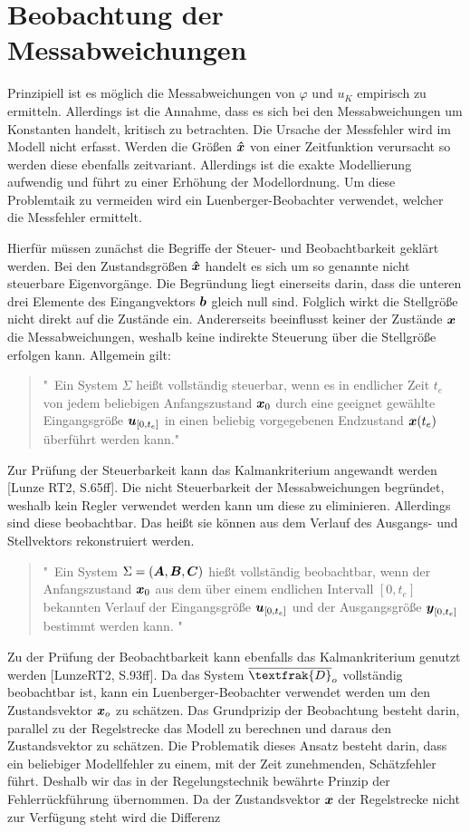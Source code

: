 \section{Beobachtung der Messabweichungen}
Prinzipiell ist es möglich die Messabweichungen von $\varphi$ und $u_K$ empirisch zu ermitteln. Allerdings ist die Annahme, dass es sich bei den Messabweichungen um Konstanten handelt, kritisch zu betrachten. Die Ursache der Messfehler wird im Modell nicht erfasst. Werden die Größen $\boldsymbol{\hat{x}}$ von einer Zeitfunktion verursacht so werden diese ebenfalls zeitvariant. Allerdings ist die exakte Modellierung aufwendig und führt zu einer Erhöhung der Modellordnung. Um diese Problemtaik zu vermeiden wird ein Luenberger-Beobachter verwendet, welcher die Messfehler ermittelt.

Hierfür müssen zunächst die Begriffe der Steuer- und Beobachtbarkeit geklärt werden. Bei den Zustandsgrößen $\boldsymbol{\hat{x}}$ handelt es sich um so genannte nicht steuerbare Eigenvorgänge. Die Begründung liegt einerseits darin, dass die unteren drei Elemente des Eingangvektors $\boldsymbol{b}$ gleich null sind. Folglich wirkt die Stellgröße nicht direkt auf die Zustände ein. Andererseits beeinflusst keiner der Zustände $\boldsymbol{x}$ die Messabweichungen, weshalb keine indirekte Steuerung über die Stellgröße erfolgen kann. Allgemein gilt:
\begin{quote}
"\ Ein System $\Sigma$ heißt vollständig steuerbar, wenn es in endlicher Zeit $t_e$ von jedem beliebigen Anfangszustand $\boldsymbol{x}_0$ durch eine geeignet gewählte Eingangsgröße $\boldsymbol{u}_{[0,t_e]}$ in einen beliebig vorgegebenen Endzustand $\boldsymbol{x}(t_e)$ überführt werden kann."
\end{quote}
Zur Prüfung der Steuerbarkeit kann das Kalmankriterium angewandt werden [Lunze RT2, S.65ff]. Die nicht Steuerbarkeit der Messabweichungen begründet, weshalb kein Regler verwendet werden kann um diese zu eliminieren. Allerdings sind diese beobachtbar. Das heißt sie können aus dem Verlauf des Ausgangs- und Stellvektors rekonstruiert werden.
\begin{quote}
"\ Ein System $\Sigma = (\boldsymbol{A},\boldsymbol{B},\boldsymbol{C})$ hießt vollständig beobachtbar, wenn der Anfangszustand $\boldsymbol{x}_0$ aus dem über einem endlichen Intervall $[0,t_e]$ bekannten Verlauf der Eingangsgröße $\boldsymbol{u}_{[0,t_e]}$ und der Ausgangsgröße $\boldsymbol{y}_{[0,t_e]}$ bestimmt werden kann. "
\end{quote}
Zu der Prüfung der Beobachtbarkeit kann ebenfalls das Kalmankriterium genutzt werden [LunzeRT2, S.93ff]. Da das System $\overline{\textfrak{D}}_o$ vollständig beobachtbar ist, kann ein Luenberger-Beobachter verwendet werden um den Zustandsvektor $\boldsymbol{x}_o$ zu schätzen. Das Grundprizip der Beobachtung besteht darin, parallel zu der Regelstrecke das Modell zu berechnen und daraus den Zustandsvektor zu schätzen. Die Problematik dieses Ansatz besteht darin, dass ein beliebiger Modellfehler zu einem, mit der Zeit zunehmenden, Schätzfehler führt. Deshalb wir das in der Regelungstechnik bewährte Prinzip der Fehlerrückführung übernommen. Da der Zustandsvektor $\boldsymbol{x}$ der Regelstrecke nicht zur Verfügung steht wird die Differenz
